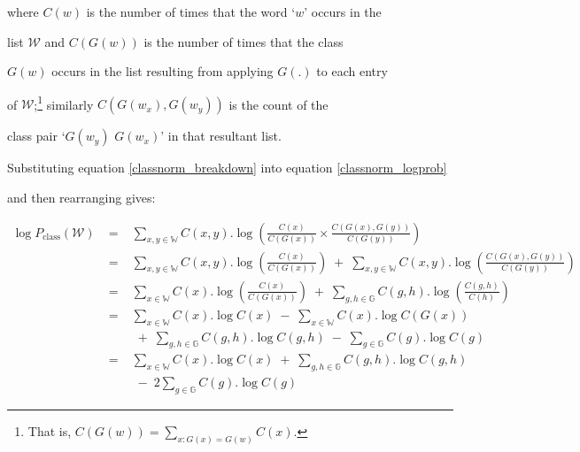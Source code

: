 where $C(w)$ is the number of times that the word `$w$' occurs in the


list $\mathcal{W}$ and $C(G(w))$ is the number of times that the class


$G(w)$ occurs in the list resulting from applying $G(.)$ to each entry


of $\mathcal{W}$;\footnote{That is, $C(G(w))=\sum_{x:


G(x)=G(w)}C(x)$.}  similarly $C(G(w_x), G(w_y))$ is the count of the


class pair `$G(w_y)$ $G(w_x)$' in that resultant list.





Substituting equation \ref{classnorm_breakdown} into equation \ref{classnorm_logprob}


and then rearranging gives:


\begin{eqnarray}


\log P_\mathrm{class}(\mathcal{W}) & \;=\; &


\sum_{x,y \in \mathbb{W}} C(x,y) . \log\left(


  \frac{C(x)}{C(G(x))} \times \frac{C(G(x),G(y))}{C(G(y))} 


  \right) \nonumber


\\


&\;=\;& \sum_{x,y \in \mathbb{W}} C(x,y) . \log


  \left(\frac{C(x)}{C(G(x))}\right)


 \;+\; \sum_{x,y \in \mathbb{W}} C(x,y)


  . \log\left(\frac{C(G(x),G(y))}{C(G(y))}\right) \nonumber


\\


&\;=\;& \sum_{x \in \mathbb{W}} C(x) . \log \left(\frac{C(x)}{C(G(x))}\right)


 \;+\; \sum_{g,h \in \mathbb{G}} C(g,h) . \log\left(\frac{C(g,h)}{C(h)}\right)


  \nonumber


\\


&\;=\;& \sum_{x \in \mathbb{W}} C(x) . \log C(x)


 \;-\; \sum_{x \in \mathbb{W}} C(x) . \log C(G(x))\nonumber\\


&&\;+\; \sum_{g,h \in \mathbb{G}} C(g,h) . \log C(g,h)


 \;-\; \sum_{g \in \mathbb{G}} C(g) . \log C(g) \nonumber


\\


&\;=\;& \sum_{x \in \mathbb{W}} C(x) . \log C(x)


 \;+\; \sum_{g,h \in \mathbb{G}} C(g,h) . \log C(g,h)\nonumber\\


&&\;-\; 2 \sum_{g \in \mathbb{G}} C(g) . \log C(g)\label{classnorm_ml}


\end{eqnarray}


